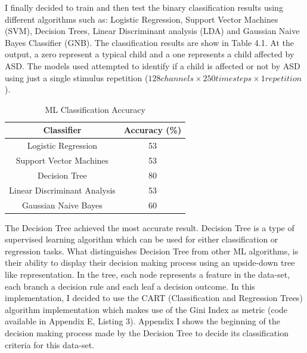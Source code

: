 I finally decided to train and then test the binary classification results using different algorithms such as: Logistic Regression, Support Vector Machines (SVM), Decision Trees, Linear Discriminant analysis (LDA) and Gaussian Naive Bayes Classifier (GNB). The classification results are show in Table 4.1. At the output, a zero represent a typical child and a one represents a child affected by ASD. The models used attempted to identify if a child is affected or not by ASD using just a single stimulus repetition ($128 channels \times250 timesteps \times1 repetition$).

{
\begin{table}[h!]
\centering
\begin{tabular}{|c|c|}
\hline
Classifier &Accuracy (\%) \\
\hline
Logistic Regression & 53  \\
Support Vector Machines & 53  \\
Decision Tree & 80  \\
Linear Discriminant Analysis & 53 \\
Gaussian Naive Bayes & 60 \\
\hline
\end{tabular}
\caption{ML Classification Accuracy}
\label{table:1}
\end{table}
}


The Decision Tree achieved the most accurate result. Decision Tree is a type of supervised learning algorithm which can be used for either classification or regression tasks. What distinguishes Decision Tree from other ML algorithms, is their ability to display their decision making process using an upside-down tree like representation. In the tree, each node represents a feature in the data-set, each branch a decision rule and each leaf a decision outcome. In this implementation, I decided to use the CART (Classification and Regression Trees) algorithm implementation which makes use of the Gini Index as metric (code available in Appendix E, Listing 3). Appendix I shows the beginning of the decision making process made by the Decision Tree to decide its classification criteria for this data-set.


